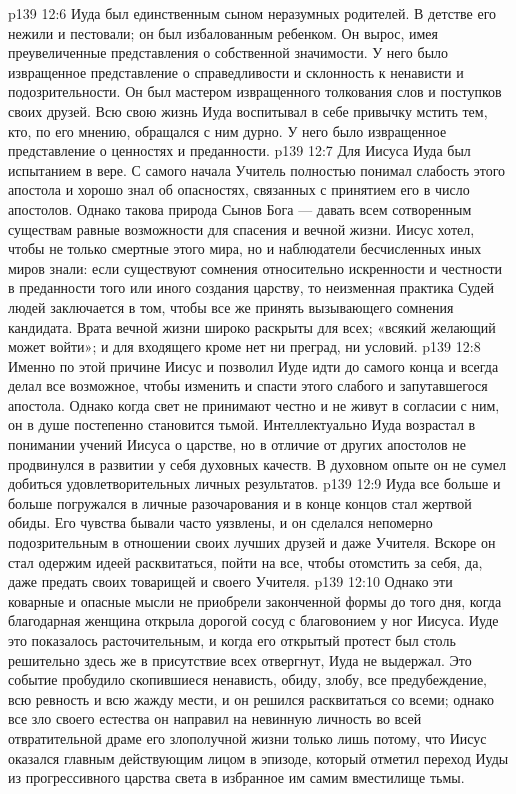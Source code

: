 \vs p139 12:6 Иуда был единственным сыном неразумных родителей. В детстве его нежили и пестовали; он был избалованным ребенком. Он вырос, имея преувеличенные представления о собственной значимости. У него было извращенное представление о справедливости и склонность к ненависти и подозрительности. Он был мастером извращенного толкования слов и поступков своих друзей. Всю свою жизнь Иуда воспитывал в себе привычку мстить тем, кто, по его мнению, обращался с ним дурно. У него было извращенное представление о ценностях и преданности.
\vs p139 12:7 \pc Для Иисуса Иуда был испытанием в вере. С самого начала Учитель полностью понимал слабость этого апостола и хорошо знал об опасностях, связанных с принятием его в число апостолов. Однако такова природа Сынов Бога --- давать всем сотворенным существам равные возможности для спасения и вечной жизни. Иисус хотел, чтобы не только смертные этого мира, но и наблюдатели бесчисленных иных миров знали: если существуют сомнения относительно искренности и честности в преданности того или иного создания царству, то неизменная практика Судей людей заключается в том, чтобы все же принять вызывающего сомнения кандидата. Врата вечной жизни широко раскрыты для всех; «всякий желающий может войти»; и для входящего кроме  нет ни преград, ни условий.
\vs p139 12:8 Именно по этой причине Иисус и позволил Иуде идти до самого конца и всегда делал все возможное, чтобы изменить и спасти этого слабого и запутавшегося апостола. Однако когда свет не принимают честно и не живут в согласии с ним, он в душе постепенно становится тьмой. Интеллектуально Иуда возрастал в понимании учений Иисуса о царстве, но в отличие от других апостолов не продвинулся в развитии у себя духовных качеств. В духовном опыте он не сумел добиться удовлетворительных личных результатов.
\vs p139 12:9 \pc Иуда все больше и больше погружался в личные разочарования и в конце концов стал жертвой обиды. Его чувства бывали часто уязвлены, и он сделался непомерно подозрительным в отношении своих лучших друзей и даже Учителя. Вскоре он стал одержим идеей расквитаться, пойти на все, чтобы отомстить за себя, да, даже предать своих товарищей и своего Учителя.
\vs p139 12:10 Однако эти коварные и опасные мысли не приобрели законченной формы до того дня, когда благодарная женщина открыла дорогой сосуд с благовонием у ног Иисуса. Иуде это показалось расточительным, и когда его открытый протест был столь решительно здесь же в присутствие всех отвергнут, Иуда не выдержал. Это событие пробудило скопившиеся ненависть, обиду, злобу, все предубеждение, всю ревность и всю жажду мести, и он решился расквитаться со всеми; однако все зло своего естества он направил на невинную личность во всей отвратительной драме его злополучной жизни только лишь потому, что Иисус оказался главным действующим лицом в эпизоде, который отметил переход Иуды из прогрессивного царства света в избранное им самим вместилище тьмы.

